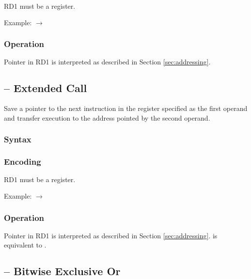 \documentclass[a4paper,12pt,twoside,extrafontsizes]{memoir}
\begin{document}
{

RD1 must be a register.

Example:  $\rightarrow$ 

\subsubsection{Operation}


Pointer in RD1 is interpreted as described in Section \ref{sec:addressing}.

\subsection{ -- Extended Call}
\label{subsec:instr:xcall}

Save a pointer to the next instruction in the register specified as the first operand and transfer execution to the address pointed by the second operand.

\subsubsection{Syntax}


\subsubsection{Encoding}


RD1 must be a register.

Example:  $\rightarrow$ 

\subsubsection{Operation}



Pointer in RD1 is interpreted as described in Section \ref{sec:addressing}.  is equivalent to .

\subsection{ -- Bitwise Exclusive Or}
\label{subsec:instr:xor}

}
\end{document}
